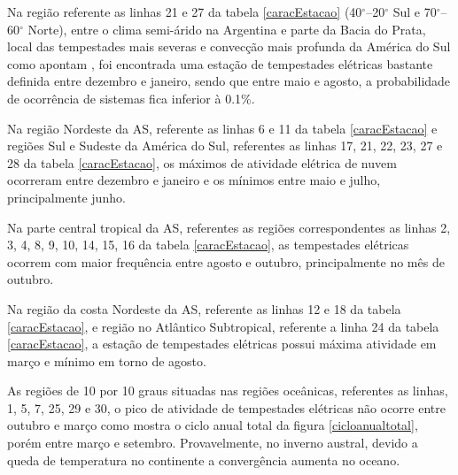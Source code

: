  

Na região referente as linhas 21 e 27 da tabela \ref{caracEstacao} (40$^{\circ}$--20$^{\circ}$ Sul e 70$^{\circ}$--60$^{\circ}$ Norte),  entre o clima semi-árido na Argentina e parte da Bacia do Prata,  local das tempestades mais severas e convecção mais profunda da América do Sul como apontam , foi encontrada uma estação de tempestades elétricas bastante definida entre dezembro e janeiro, sendo que entre maio e agosto, a probabilidade de ocorrência de sistemas fica inferior à 0.1\%.%

Na região Nordeste da AS,  referente as linhas 6 e 11 da tabela \ref{caracEstacao} e regiões Sul e Sudeste da América do Sul, referentes as linhas 17, 21, 22, 23, 27 e 28 da tabela \ref{caracEstacao}, os máximos de atividade elétrica de nuvem ocorreram entre dezembro e janeiro e os mínimos entre maio e julho, principalmente junho.

Na parte central tropical da AS, referentes as regiões correspondentes as linhas 2, 3, 4, 8, 9, 10, 14, 15, 16 da tabela \ref{caracEstacao}, as tempestades elétricas ocorrem com maior frequência entre agosto e outubro, principalmente no mês de outubro. 

Na região da costa Nordeste da AS, referente as linhas 12 e 18 da tabela \ref{caracEstacao}, e região no Atlântico Subtropical, referente a linha 24 da tabela \ref{caracEstacao}, a estação de tempestades elétricas possui máxima atividade em março e mínimo em torno de agosto.

As regiões de 10 por 10 graus situadas nas regiões oceânicas, referentes as linhas, 1, 5, 7, 25, 29 e 30, o pico de atividade de tempestades elétricas não ocorre entre outubro e março como mostra o ciclo anual total da figura \ref{cicloanualtotal}, porém entre março e setembro. Provavelmente, no inverno austral, devido a queda de temperatura no continente a convergência aumenta no oceano.


